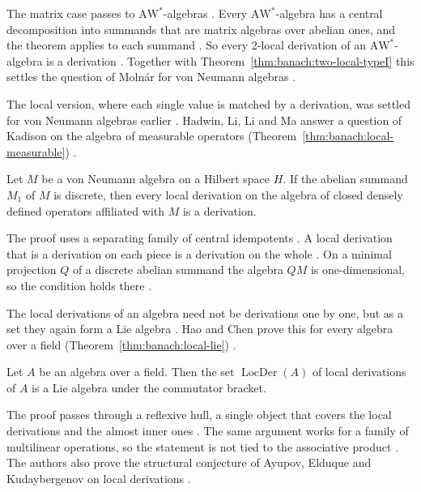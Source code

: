 The matrix case passes to $\mathrm{AW}^*$-algebras
\cite[p.~11]{AyupovKudaybergenov2014Matrix}. Every
$\mathrm{AW}^*$-algebra has a central decomposition into summands that are
matrix algebras over abelian ones, and the theorem applies to each summand
\cite[p.~11]{AyupovKudaybergenov2014Matrix}. So every 2-local derivation
of an $\mathrm{AW}^*$-algebra is a derivation
\cite[Theorem~3.1, p.~11]{AyupovKudaybergenov2014Matrix}. Together with
Theorem~\ref{thm:banach:two-local-typeI} this settles the question of
Moln\'ar for von Neumann algebras
\cite[p.~2]{AyupovKudaybergenov2014Matrix}.

The local version, where each single value is matched by a derivation, was
settled for von Neumann algebras earlier \cite[p.~1]{HadwinLiLiMa2013}.
Hadwin, Li, Li and Ma answer a question of Kadison on the algebra of
measurable operators (Theorem~\ref{thm:banach:local-measurable})
\cite[p.~1]{HadwinLiLiMa2013}.\begin{theorem}\label{thm:banach:local-measurable} Let $M$ be a von
Neumann algebra on a Hilbert space $H$. If the abelian summand $M_1$ of $M$ is
discrete, then every local derivation on the algebra of closed densely defined
operators affiliated with $M$ is a derivation. \end{theorem}

The proof uses a separating family of central idempotents
\cite[Lemma~2, p.~2]{HadwinLiLiMa2013}. A local derivation that is a
derivation on each piece is a derivation on the whole
\cite[p.~2]{HadwinLiLiMa2013}. On a minimal projection $Q$ of a discrete
abelian summand the algebra $QM$ is one-dimensional, so the condition holds
there \cite[p.~3]{HadwinLiLiMa2013}.

The local derivations of an algebra need not be derivations one by one, but as
a set they again form a Lie algebra \cite[p.~1]{HaoChen2026Local}. Hao and
Chen prove this for every algebra over a field
(Theorem~\ref{thm:banach:local-lie}) \cite[p.~1]{HaoChen2026Local}.

\begin{theorem}\label{thm:banach:local-lie}
Let $A$ be an algebra over a field. Then the set $\operatorname{LocDer}(A)$
of local derivations of $A$ is a Lie algebra under the commutator bracket.
\end{theorem}

The proof passes through a reflexive hull, a single object that covers the
local derivations and the almost inner ones \cite[p.~1]{HaoChen2026Local}. The
same argument works for a family of multilinear operations, so the statement
is not tied to the associative product \cite[p.~5]{HaoChen2026Local}. The
authors also prove the structural conjecture of Ayupov, Elduque and
Kudaybergenov on local derivations \cite[p.~1]{HaoChen2026Local}.

